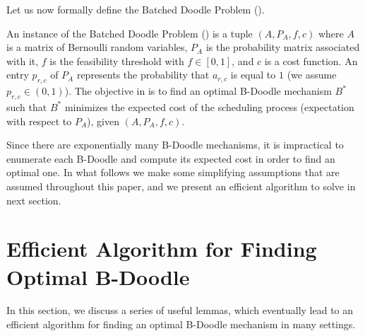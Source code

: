 Let us now formally define the Batched Doodle Problem (\BDP).
\begin{definition} \label{bdoodle:def:Problem}
	An instance of the Batched Doodle Problem (\BDP) is a tuple $(A, P_A, f, c)$
	where $A$ is a matrix of Bernoulli random variables,
	$P_A$ is the probability matrix associated with it,
	$f$ is the feasibility threshold with $f \in [0,1]$,
	and $c$ is a cost function.
	An entry $p_{r,c}$ of $P_A$ represents the probability that $a_{r,c}$ is equal to $1$ (we assume $p_{r,c}\in (0,1)$).
	The objective in \BDPs is to find an optimal B-Doodle mechanism $B^*$ such that $B^*$ minimizes the expected cost of the scheduling process (expectation with respect to $P_A$), given $(A, P_A, f, c)$.
\end{definition}

Since there are exponentially many B-Doodle mechanisms, it is impractical to enumerate each B-Doodle and compute its expected cost in order to find an optimal one. In what follows we make some simplifying assumptions that are assumed throughout this paper, and we present an efficient algorithm to solve \BDPs in next section.


\section{Efficient Algorithm for Finding Optimal B-Doodle}
In this section, we discuss a series of useful lemmas, which eventually lead to an efficient algorithm for finding an optimal B-Doodle mechanism in many settings. 

